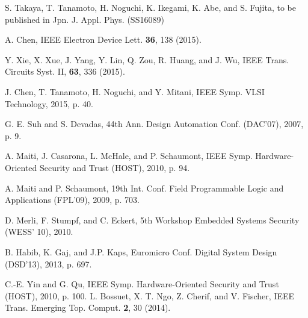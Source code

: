 \documentclass[%
reprint, amsmath,amssymb,%
pra,
]{revtex4-1}
\begin{document}
\begin{thebibliography}{99}
S. Takaya, T. Tanamoto,  H. Noguchi, K. Ikegami, K. Abe, and S. Fujita,
to be published in Jpn. J. Appl. Phys. (SS16089)

A. Chen,
IEEE Electron Device Lett. {\bf 36}, 138 (2015).

Y. Xie, X. Xue, J. Yang, Y. Lin, Q. Zou, R. Huang, and J. Wu,
IEEE Trans. Circuits Syst. II, {\bf 63}, 336 (2015).

J. Chen, T. Tanamoto, H. Noguchi, and Y. Mitani,
IEEE Symp. VLSI Technology, 2015, p. 40.

G. E. Suh and S. Devadas, 
44th Ann. Design Automation Conf. (DAC'07), 2007, p. 9.

A. Maiti, J. Casarona, L. McHale, and P. Schaumont, 
IEEE Symp. Hardware-Oriented Security and Trust (HOST), 2010, p. 94.

A. Maiti and P. Schaumont, 
19th Int. Conf. Field Programmable Logic and Applications 
(FPL'09), 2009, p. 703.


D. Merli, F. Stumpf, and C. Eckert, 
5th Workshop Embedded Systems Security (WESS' 10), 2010.

B. Habib, K. Gaj, and J.P. Kaps, 
Euromicro Conf. Digital System Design (DSD'13), 2013, p. 697.

C.-E. Yin and G. Qu, %
IEEE Symp. Hardware-Oriented Security and Trust (HOST), 2010, p. 100.
L. Bossuet, X. T. Ngo, Z. Cherif, and V. Fischer, 
IEEE Trans. Emerging Top. Comput. {\bf 2}, 30 (2014).



\end{thebibliography}
\end{document}
